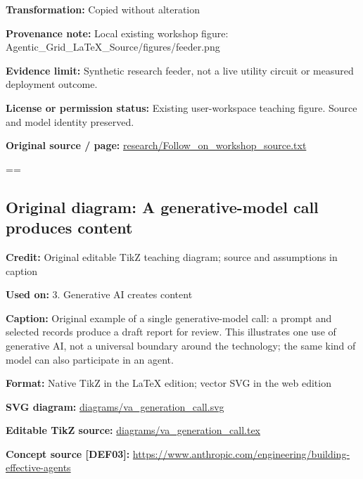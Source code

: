 \documentclass[10pt,letterpaper]{article}
\begin{document}
\textbf{Transformation:} Copied without alteration\par
\textbf{Provenance note:} Local existing workshop figure: Agentic\_Grid\_LaTeX\_Source/figures/feeder.png\par
\textbf{Evidence limit:} Synthetic research feeder, not a live utility circuit or measured deployment outcome.\par
\textbf{License or permission status:} Existing user-workspace teaching figure. Source and model identity preserved.\par
\textbf{Original source / page:} \href{../research/Follow_on_workshop_source.txt}{\small\ttfamily research/\allowbreak{}Follow\_\allowbreak{}on\_\allowbreak{}workshop\_\allowbreak{}source.\allowbreak{}txt}\par
\egroup\par\noindent\box\readingEntry\par\medskip
\setbox\readingEntry=\vbox\bgroup\hsize=\linewidth\subsection*{Original diagram: A generative-model call produces content}
\textbf{Credit:} Original editable TikZ teaching diagram; source and assumptions in caption\par
\textbf{Used on:} 3. Generative AI creates content\par
\textbf{Caption:} Original example of a single generative-model call: a prompt and selected records produce a draft report for review. This illustrates one use of generative AI, not a universal boundary around the technology; the same kind of model can also participate in an agent.\par
\textbf{Format:} Native TikZ in the LaTeX edition; vector SVG in the web edition\par
\textbf{SVG diagram:} \href{diagrams/va_generation_call.svg}{\small\ttfamily diagrams/\allowbreak{}va\_\allowbreak{}generation\_\allowbreak{}call.\allowbreak{}svg}\par
\textbf{Editable TikZ source:} \href{diagrams/va_generation_call.tex}{\small\ttfamily diagrams/\allowbreak{}va\_\allowbreak{}generation\_\allowbreak{}call.\allowbreak{}tex}\par
\textbf{Concept source [DEF03]:} \href{https://www.anthropic.com/engineering/building-effective-agents}{\small\ttfamily https:/\allowbreak{}/\allowbreak{}www.\allowbreak{}anthropic.\allowbreak{}com/\allowbreak{}engineering/\allowbreak{}building-\allowbreak{}effective-\allowbreak{}agents}\par
\end{document}
